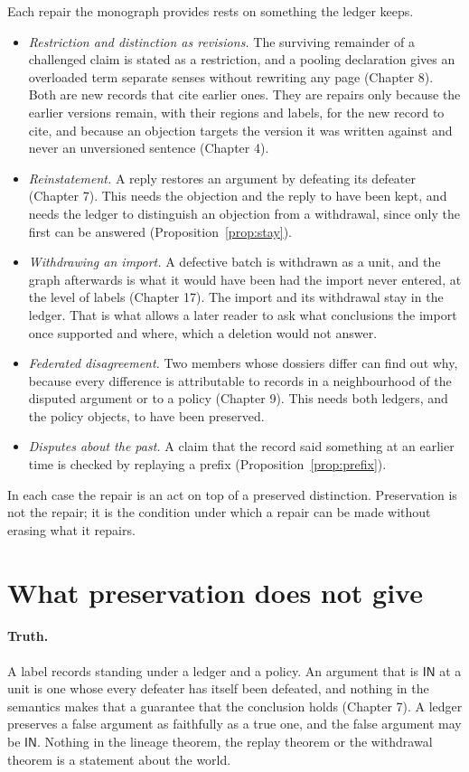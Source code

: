\documentclass[11pt]{article}
\theoremstyle{plain}
\theoremstyle{definition}
\theoremstyle{remark}
\newcommand{\IN}{\textsf{IN}}
\begin{document}
Each repair the monograph provides rests on something the ledger keeps.
\begin{itemize}
\item \emph{Restriction and distinction as revisions.} The surviving remainder of a challenged claim is stated as a restriction, and a pooling declaration gives an overloaded term separate senses without rewriting any page (Chapter 8). Both are new records that cite earlier ones. They are repairs only because the earlier versions remain, with their regions and labels, for the new record to cite, and because an objection targets the version it was written against and never an unversioned sentence (Chapter 4).
\item \emph{Reinstatement.} A reply restores an argument by defeating its defeater (Chapter 7). This needs the objection and the reply to have been kept, and needs the ledger to distinguish an objection from a withdrawal, since only the first can be answered (Proposition~\ref{prop:stay}).
\item \emph{Withdrawing an import.} A defective batch is withdrawn as a unit, and the graph afterwards is what it would have been had the import never entered, at the level of labels (Chapter 17). The import and its withdrawal stay in the ledger. That is what allows a later reader to ask what conclusions the import once supported and where, which a deletion would not answer.
\item \emph{Federated disagreement.} Two members whose dossiers differ can find out why, because every difference is attributable to records in a neighbourhood of the disputed argument or to a policy (Chapter 9). This needs both ledgers, and the policy objects, to have been preserved.
\item \emph{Disputes about the past.} A claim that the record said something at an earlier time is checked by replaying a prefix (Proposition~\ref{prop:prefix}).
\end{itemize}
In each case the repair is an act on top of a preserved distinction. Preservation is not the repair; it is the condition under which a repair can be made without erasing what it repairs.

\section{What preservation does not give}\label{sec:limits}

\paragraph{Truth.} A label records standing under a ledger and a policy. An argument that is $\IN$ at a unit is one whose every defeater has itself been defeated, and nothing in the semantics makes that a guarantee that the conclusion holds (Chapter 7). A ledger preserves a false argument as faithfully as a true one, and the false argument may be $\IN$. Nothing in the lineage theorem, the replay theorem or the withdrawal theorem is a statement about the world.
\end{document}
